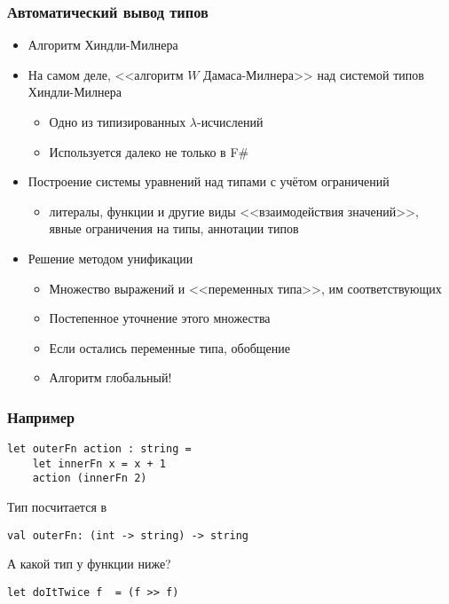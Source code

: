 \documentclass{../../slides-style}
\begin{document}
    \begin{frame}
        \frametitle{Автоматический вывод типов}
        \begin{itemize}
            \item Алгоритм Хиндли-Милнера
            \item На самом деле, <<алгоритм $W$ Дамаса-Милнера>> над системой типов Хиндли-Милнера
            \begin{itemize}
                \item Одно из типизированных $\lambda$-исчислений
                \item Используется далеко не только в F\#
            \end{itemize}
            \item Построение системы уравнений над типами с учётом ограничений
            \begin{itemize}
                \item литералы, функции и другие виды <<взаимодействия значений>>, явные ограничения на типы, аннотации типов
            \end{itemize}
            \item Решение методом унификации
            \begin{itemize}
                \item Множество выражений и <<переменных типа>>, им соответствующих
                \item Постепенное уточнение этого множества
                \item Если остались переменные типа, обобщение
                \item Алгоритм глобальный!
            \end{itemize}
        \end{itemize}
    \end{frame}

    \begin{frame}[fragile]
        \frametitle{Например}
        \begin{verbatim}
let outerFn action : string =
    let innerFn x = x + 1
    action (innerFn 2)
        \end{verbatim}

        Тип посчитается в
        \begin{verbatim}
val outerFn: (int -> string) -> string
        \end{verbatim}

        \vspace{1cm}
        А какой тип у функции ниже?
        \begin{verbatim}
let doItTwice f  = (f >> f)
        \end{verbatim}
    \end{frame}
\end{document}
